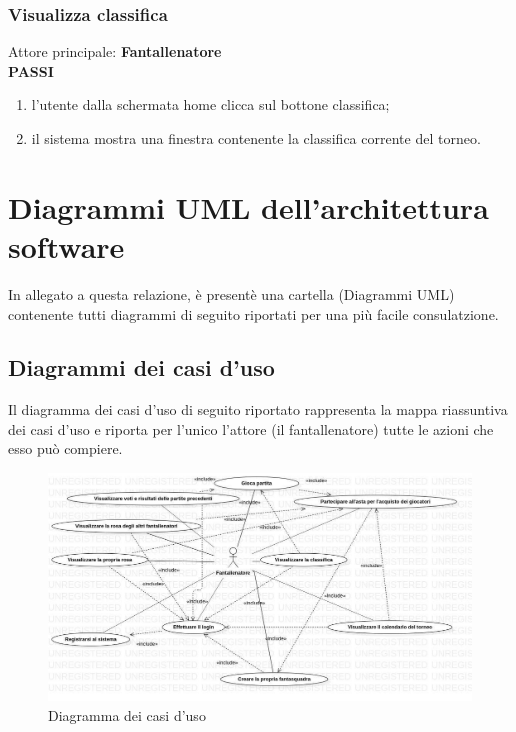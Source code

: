 \documentclass[12pt,a4paper]{article}
\begin{document}
\subsubsection{Visualizza classifica}
Attore principale: \textbf{Fantallenatore}\\
\newline
\textbf{PASSI}
\begin{enumerate}
\item l'utente dalla schermata home clicca sul bottone classifica;
\item il sistema mostra una finestra contenente la classifica corrente del torneo.
\end{enumerate}
\newpage
\section{Diagrammi UML dell'architettura software}
In allegato a questa relazione, è presentè una cartella (Diagrammi UML) contenente tutti diagrammi di seguito riportati per una più facile consulatzione.
\subsection{Diagrammi dei casi d'uso}
Il diagramma dei casi d'uso di seguito riportato rappresenta la mappa riassuntiva dei casi d'uso  e riporta per l'unico l'attore (il fantallenatore) tutte le azioni che esso può compiere.\\
\begin{figure}[h]
\centering
\includegraphics[width=15 cm,keepaspectratio]{diagrammaCasiUso.jpg}
\caption{Diagramma dei casi d'uso}
\end{figure}
\end{document}
